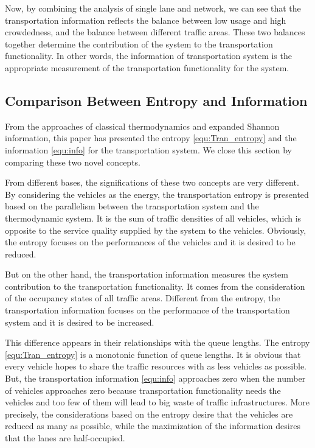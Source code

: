\documentclass[preprint,authoryear,12pt]{elsarticle}
\begin{document}

Now, by combining the analysis of single lane and network, we can see that the transportation information reflects the balance between low usage and high crowdedness, and the balance between different traffic areas. These two balances together determine the contribution of the system to the transportation functionality. In other words, the information of transportation system is the appropriate measurement of the transportation functionality for the system.

\subsection{Comparison Between Entropy and Information}


From the approaches of classical thermodynamics and expanded Shannon information, this paper has presented the entropy \eqref{equ:Tran_entropy} and the information \eqref{equ:info} for the transportation system. We close this section by comparing these two novel concepts.

From different bases, the significations of these two concepts are very different. By considering the vehicles as the energy, the transportation entropy is presented based on the parallelism between the transportation system and the thermodynamic system. It is the sum of traffic densities of all vehicles, which is opposite to the service quality supplied by the system to the vehicles. Obviously, the entropy focuses on the performances of the vehicles and it is desired to be reduced.

But on the other hand, the transportation information measures the system contribution to the transportation functionality. It comes from the consideration of the occupancy states of all traffic areas. Different from the entropy, the transportation information focuses on the performance of the transportation system and it is desired to be increased.

This difference appears in their relationships with the queue lengths. The entropy \eqref{equ:Tran_entropy} is a monotonic function of queue lengths. It is obvious that every vehicle hopes to share the traffic resources with as less vehicles as possible. But, the transportation information \eqref{equ:info} approaches zero when the number of vehicles approaches zero because transportation functionality needs the vehicles and too few of them will lead to big waste of traffic infrastructures. More precisely, the considerations based on the entropy desire that the vehicles are reduced as many as possible, while the maximization of the information desires that the lanes are half-occupied.
\end{document}
